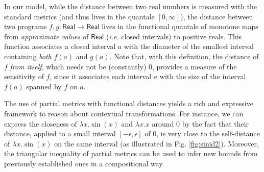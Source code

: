 In our model, while the distance between two real numbers is measured with the standard metrics (and thus lives in the quantale $[0,\infty]$), the distance between  two programs $f,g:\mathsf{Real}\to \mathsf{Real}$ lives in the functional quantale of monotone maps from \emph{approximate values} of $\mathsf{Real}$ (\emph{i.e.} closed intervals) to positive reals. This function associates a closed interval $a$ with the diameter of the smallest interval containing \emph{both} $f(a)$ and $g(a)$. 
Note that, with this definition, 
 the distance of $f$ \emph{from itself}, which needs not be (constantly) 0,  provides a measure of the sensitivity of $f$, since it associates each interval $a$ with the size of the interval $f(a)$ spanned by $f$ on $a$. %





The use of partial metrics with functional distances yields a rich and expressive framework to reason about  
contextual transformations. For instance, we can express the closeness of $\lambda x.\sin(x)$ and $\lambda x.x$ around 0 by the fact that their distance, applied to a small interval $[-\epsilon,\epsilon]$ of 0, is very close to the {self-distance} of
$\lambda x.\sin(x)$ on the same interval (as illustrated in Fig. \ref{fig:sinid2}). Moreover, the {triangular inequality} of partial metrics  can be used to infer new bounds from previously established ones in a compositional way.

%

